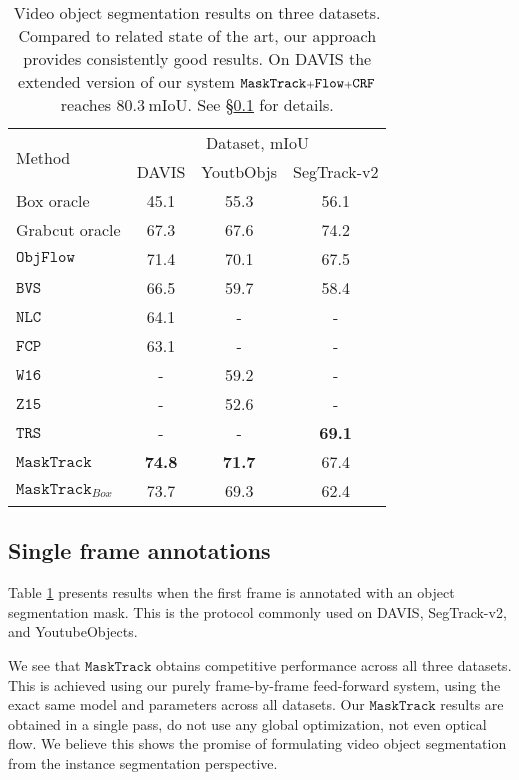 \documentclass[10pt,twocolumn,letterpaper]{article}
\newcommand{\segtrack}{SegTrack-v2}
\begin{document}
\begin{table}
\begin{centering}
\begingroup
\begin{tabular}{l|ccc}
\multirow{2}{*}{Method} & \multicolumn{3}{c}{Dataset, mIoU}\tabularnewline
	& {\footnotesize{}DAVIS} & {\footnotesize{}YoutbObjs} & {\footnotesize{}\segtrack{}}\tabularnewline
\hline
\hline
Box oracle  & 45.1  & 55.3 & 56.1 \tabularnewline
Grabcut oracle & 67.3 & 67.6 & 74.2\tabularnewline
\hline
$\mathtt{ObjFlow}$ \cite{Tsai2016Cvpr} & 71.4 & 70.1 & 67.5\tabularnewline
$\mathtt{BVS}$ \cite{Maerki2016Cvpr} & 66.5 & 59.7 & 58.4\tabularnewline
 $\mathtt{NLC}$ \cite{Faktor2014Bmvc} & 64.1 & - & -\tabularnewline
$\mathtt{FCP}$ \cite{Perazzi2015Iccv} & 63.1 & - & -\tabularnewline
$\mathtt{W16}$ \cite{Wang2016Accv} & - & 59.2 & -\tabularnewline
$\mathtt{Z15}$ \cite{Zhang2015CvprObjectSegmentation} & - & 52.6 & -\tabularnewline
$\mathtt{TRS}$ \cite{Xiao2016Cvpr}  & -  & - & \textbf{69.1} \tabularnewline
\hline
$\mathtt{MaskTrack}$\hspace*{1.5em} & \textbf{74.8} & \textbf{71.7} & 67.4\tabularnewline
$\mathtt{MaskTrack}_{Box}$ & 73.7  & 69.3 & 62.4\tabularnewline
\end{tabular}\endgroup
\par\end{centering}
\caption{\label{tab:VOS-results}Video object segmentation results on three
datasets. Compared to related state of the art, our approach provides
consistently good results. On DAVIS the extended version of our system $\mathtt{MaskTrack\mathsmaller{+}Flow \mathsmaller{+}CRF}$ reaches $80.3\ \text{mIoU}$. See \S\ref{sec:single-frame-results} for details.}
\end{table}

\subsection{Single frame annotations}
\label{sec:single-frame-results}

Table \ref{tab:VOS-results} presents results when the first frame is annotated with an object segmentation mask. This is the protocol commonly used on DAVIS, \segtrack{}, and YoutubeObjects.

We see that $\mathtt{MaskTrack}$ obtains competitive performance across all three datasets. This is achieved using our purely frame-by-frame feed-forward system, using the exact same model and parameters across all datasets.
Our $\mathtt{MaskTrack}$ results are obtained in a single pass, do not use any global optimization, not even optical flow.
We believe this shows the promise of formulating video object segmentation from the instance segmentation perspective.
\end{document}
